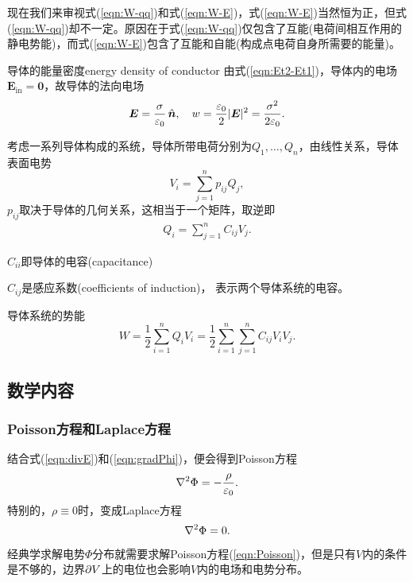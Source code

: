 现在我们来审视式(\ref{eqn:W-qq})和式(\ref{eqn:W-E})，式(\ref{eqn:W-E})当然恒为正，但式(\ref{eqn:W-qq})却不一定。原因在于式(\ref{eqn:W-qq})仅包含了互能(电荷间相互作用的静电势能)，而式(\ref{eqn:W-E})包含了互能和自能(构成点电荷自身所需要的能量)。
\begin{example}{导体的能量密度}{energy density of conductor}
    由式(\ref{eqn:Et2-Et1})，导体内的电场$\bm E_\text{in}=\bm 0$，故导体的法向电场
    \[
        \bm E=\frac\sigma{\varepsilon_0}\mathop{}\!\hat{\bm n},\quad w=\frac{\varepsilon_0}2|\bm E|^2=\frac{\sigma^2}{2\varepsilon_0}.
    \]
\end{example}
考虑一系列导体构成的系统，导体所带电荷分别为$Q_1,\ldots,Q_n$，由线性关系，导体表面电势
\[
    V_i=\sum_{j=1}^np_{ij}Q_j,
\]
$p_{ij}$取决于导体的几何关系，这相当于一个矩阵，取逆即
\begin{align}
    Q_i=\sum_{j=1}^nC_{ij}V_j.
\end{align}
\begin{compactitem}
	\item $C_{ii}$即导体的电容(capacitance)%
	\item $C_{ij}$是感应系数(coefficients of induction)，%
    表示两个导体系统的电容。
\end{compactitem}
导体系统的势能
\[
    W=\frac12\sum_{i=1}^nQ_iV_i=\frac12\sum_{i=1}^n\sum_{j=1}^nC_{ij}V_iV_j.
\]
\subsection{数学内容}
\subsubsection{Poisson方程和Laplace方程}
结合式(\ref{eqn:divE})和(\ref{eqn:gradPhi})，便会得到Poisson方程
\begin{align}
    \label{eqn:Poisson}
    \nabla^2\Phi=-\frac\rho{\varepsilon_0}.
\end{align}
特别的，$\rho\equiv 0$时，变成Laplace方程
\begin{align}
    \label{eqn:Laplace}
    \nabla^2\Phi=0.
\end{align}
经典学求解电势$\Phi$分布就需要求解Poisson方程(\ref{eqn:Poisson})，但是只有$V$内的条件是不够的，边界$\partial V$上的电位也会影响$V$内的电场和电势分布。
